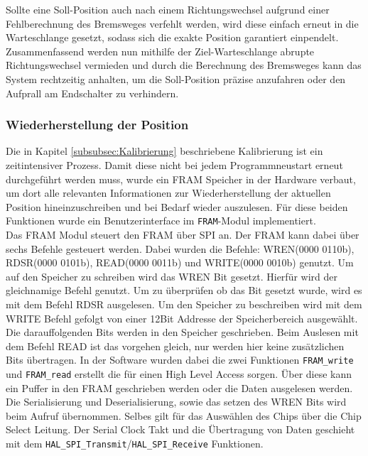 \noindent
Sollte eine Soll-Position auch nach einem Richtungswechsel aufgrund einer Fehlberechnung des Bremsweges verfehlt werden, wird diese einfach erneut in die Warteschlange gesetzt, sodass sich die exakte Position garantiert einpendelt. Zusammenfassend werden nun mithilfe der Ziel-Warteschlange abrupte Richtungswechsel vermieden und durch die Berechnung des Bremsweges kann das System rechtzeitig anhalten, um die Soll-Position präzise anzufahren oder den Aufprall am Endschalter zu verhindern.
\subsubsection{Wiederherstellung der Position}
Die in Kapitel \ref{subsubsec:Kalibrierung} beschriebene Kalibrierung ist ein zeitintensiver Prozess. Damit diese nicht bei jedem Programmneustart erneut durchgeführt werden muss, wurde ein FRAM Speicher in der Hardware verbaut, um dort alle relevanten Informationen zur Wiederherstellung der aktuellen Position hineinzuschreiben und bei Bedarf wieder auszulesen. Für diese beiden Funktionen wurde ein Benutzerinterface im \verb|FRAM|-Modul implementiert.\\

\noindent
Das \ac{FRAM} Modul steuert den \ac{FRAM} über \ac{SPI} an. Der FRAM kann dabei über sechs Befehle gesteuert werden. Dabei wurden die Befehle: WREN(0000 0110b), RDSR(0000 0101b), READ(0000 0011b) und WRITE(0000 0010b) genutzt. Um auf den Speicher zu schreiben wird das \ac{WREN} Bit gesetzt. Hierfür wird der gleichnamige Befehl genutzt. Um zu überprüfen ob das Bit gesetzt wurde, wird es mit dem Befehl RDSR ausgelesen. Um den Speicher zu beschreiben wird mit dem WRITE Befehl gefolgt von einer 12Bit Addresse der Speicherbereich ausgewählt. Die darauffolgenden Bits werden in den Speicher geschrieben. Beim Auslesen mit dem Befehl READ ist das vorgehen gleich, nur werden hier keine zusätzlichen Bits übertragen. In der Software wurden dabei die zwei Funktionen \verb|FRAM_write| und \verb|FRAM_read| erstellt die für einen High Level Access sorgen. Über diese kann ein Puffer in den \ac{FRAM} geschrieben werden oder die Daten ausgelesen werden. Die Serialisierung und Deserialisierung, sowie das setzen des \ac{WREN} Bits wird beim Aufruf übernommen. Selbes gilt für das Auswählen des Chips über die Chip Select Leitung. Der Serial Clock Takt und die Übertragung von Daten geschieht mit dem \verb|HAL_SPI_Transmit|/\verb|HAL_SPI_Receive| Funktionen.\\

